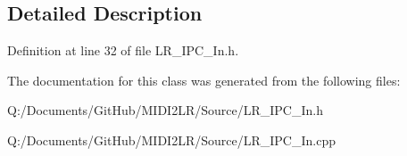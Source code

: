 \subsection{Detailed Description}


Definition at line 32 of file L\+R\+\_\+\+I\+P\+C\+\_\+\+In.\+h.



The documentation for this class was generated from the following files\+:\begin{DoxyCompactItemize}
\item 
Q\+:/\+Documents/\+Git\+Hub/\+M\+I\+D\+I2\+L\+R/\+Source/L\+R\+\_\+\+I\+P\+C\+\_\+\+In.\+h\item 
Q\+:/\+Documents/\+Git\+Hub/\+M\+I\+D\+I2\+L\+R/\+Source/L\+R\+\_\+\+I\+P\+C\+\_\+\+In.\+cpp\end{DoxyCompactItemize}
